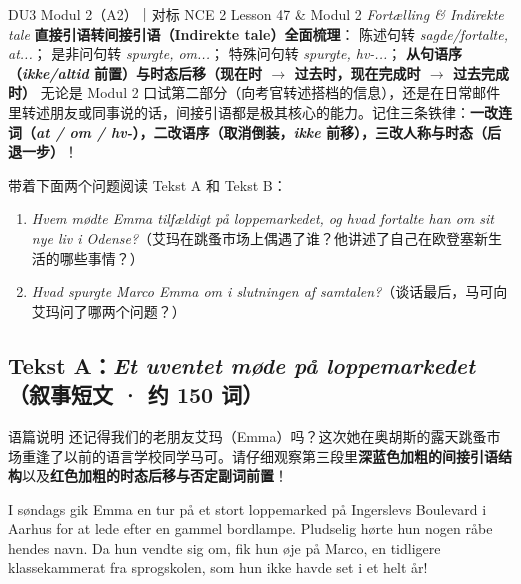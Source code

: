 {DU3 Modul 2（A2）｜对标 NCE 2 Lesson 47 \& Modul 2 \textit{Fortælling \& Indirekte tale}}
{\textbf{直接引语转间接引语（Indirekte tale）全面梳理}： 陈述句转 \textit{sagde/fortalte, at...}； 是非问句转 \textit{spurgte, om...}； 特殊问句转 \textit{spurgte, hv-...}； \textbf{从句语序（\textit{ikke/altid} 前置）与时态后移（现在时 $\rightarrow$ 过去时，现在完成时 $\rightarrow$ 过去完成时）}}
{无论是 Modul 2 口试第二部分（向考官转述搭档的信息），还是在日常邮件里转述朋友或同事说的话，间接引语都是极其核心的能力。记住三条铁律：\textbf{一改连词（\textit{at / om / hv-}），二改语序（取消倒装，\textit{ikke} 前移），三改人称与时态（后退一步）}！}

\begin{foerduleaeser}
带着下面两个问题阅读 Tekst A 和 Tekst B：
\begin{enumerate}
  \item \textit{Hvem mødte Emma tilfældigt på loppemarkedet, og hvad fortalte han om sit nye liv i Odense?}（艾玛在跳蚤市场上偶遇了谁？他讲述了自己在欧登塞新生活的哪些事情？）
  \item \textit{Hvad spurgte Marco Emma om i slutningen af samtalen?}（谈话最后，马可向艾玛问了哪两个问题？）
\end{enumerate}
\end{foerduleaeser}


\subsection*{Tekst A：\textit{Et uventet møde på loppemarkedet}（叙事短文 · 约 150 词）}

\begin{tipbox}{语篇说明}
还记得我们的老朋友艾玛（Emma）吗？这次她在奥胡斯的露天跳蚤市场重逢了以前的语言学校同学马可。请仔细观察第三段里\textbf{\color{NCDNavy}深蓝色加粗的间接引语结构}以及\textbf{\color{NCDRed}红色加粗的时态后移与否定副词前置}！
\end{tipbox}

I søndags gik Emma en tur på et stort loppemarked på Ingerslevs Boulevard i Aarhus for at lede efter en gammel bordlampe. Pludselig hørte hun nogen råbe hendes navn. Da hun vendte sig om, fik hun øje på Marco, en tidligere klassekammerat fra sprogskolen, som hun ikke havde set i et helt år!

